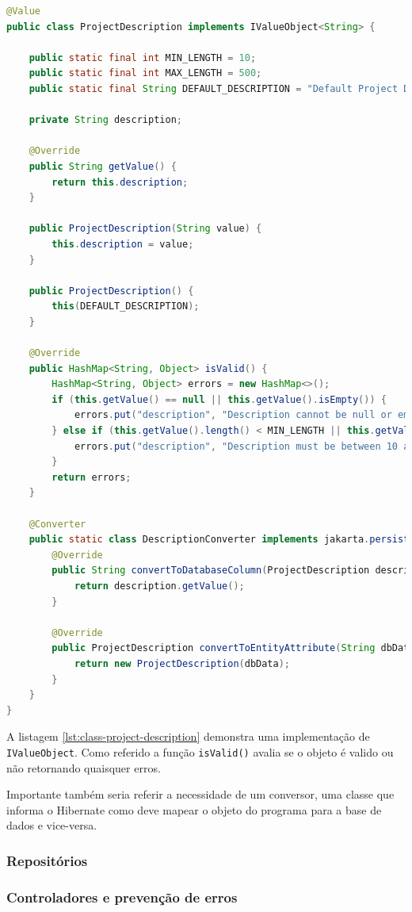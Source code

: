 \begin{lstlisting}[language=Java,caption={Classe \textit{ProjectDescription}},label={lst:class-project-description}]
@Value
public class ProjectDescription implements IValueObject<String> {

    public static final int MIN_LENGTH = 10;
    public static final int MAX_LENGTH = 500;
    public static final String DEFAULT_DESCRIPTION = "Default Project Description";

    private String description;

    @Override
    public String getValue() {
        return this.description;
    }

    public ProjectDescription(String value) {
        this.description = value;
    }

    public ProjectDescription() {
        this(DEFAULT_DESCRIPTION);
    }

    @Override
    public HashMap<String, Object> isValid() {
        HashMap<String, Object> errors = new HashMap<>();
        if (this.getValue() == null || this.getValue().isEmpty()) {
            errors.put("description", "Description cannot be null or empty");
        } else if (this.getValue().length() < MIN_LENGTH || this.getValue().length() > MAX_LENGTH) {
            errors.put("description", "Description must be between 10 and 500 characters long");
        }
        return errors;
    }

    @Converter
    public static class DescriptionConverter implements jakarta.persistence.AttributeConverter<ProjectDescription, String> {
        @Override
        public String convertToDatabaseColumn(ProjectDescription description) {
            return description.getValue();
        }

        @Override
        public ProjectDescription convertToEntityAttribute(String dbData) {
            return new ProjectDescription(dbData);
        }
    }
}
\end{lstlisting}

A listagem \ref{lst:class-project-description} demonstra uma implementação de \lstinline|IValueObject|. Como referido a função \lstinline|isValid()| avalia se o objeto é valido ou não retornando quaisquer erros.

Importante também seria referir a necessidade de um conversor, uma classe que informa o \gls{Hibernate} como deve mapear o objeto do programa para a base de dados e vice-versa.

\subsubsection{Repositórios}



\subsubsection{Controladores e prevenção de erros}